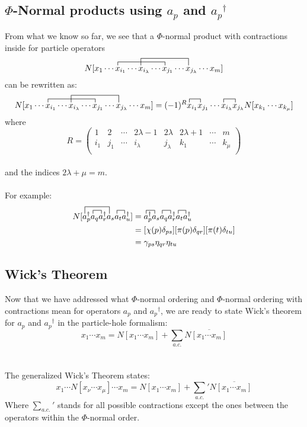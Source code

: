 \documentclass{article}
\newcommand{\ol}{\overline}
\newcommand{\fctr}{\contraction}
\newcommand{\dg}{\ensuremath{^\dagger} }
\newcommand{\cd}{\ensuremath{\cdots} }
\begin{document}
\subsection{$\Phi$-Normal products using $a_p$ and $a_p\dg$}
From what we know so far, we see that a $\Phi$-normal product with contractions inside for particle operators
\[ 
\fctr{N[x_1 \cd }{x}{{}_{i_1} \cd x_{i_\lambda} \cd }{x}
\fctr[2ex]{N[x_1 \cd x_{i_1} \cd}{ x}{{}_{i_\lambda} \cd x_{j_1} \cd }{x} 
N[x_1 \cd x_{i_1} \cd x_{i_\lambda} \cd x_{j_1} \cd x_{j_\lambda} \cd x_m] 
\] 
can be rewritten as: 
\[ 
\fctr{N[x_1 \cd }{x}{{}_{i_1} \cd x_{i_\lambda} \cd }{x}
\fctr[2ex]{N[x_1 \cd x_{i_1} \cd}{ x}{{}_{i_\lambda} \cd x_{j_1} \cd }{x} 
N[x_1 \cd x_{i_1} \cd x_{i_\lambda} \cd x_{j_1} \cd x_{j_\lambda} \cd x_m] 
= 
\fctr{(-1)^R}{x}{{}_{i_1} }{x}
\fctr{(-1)^R x_{i_1}x_{j_1} \cd}{x}{{}_{i_\lambda} }{x}
(-1)^R x_{i_1}x_{j_1} \cd x_{i_\lambda} x_{j_\lambda} N[x_{k_1} \cd x_{k_\mu}]
\] 
where 
\[
R = 
\begin{pmatrix}
1 & 2 & \cd & 2\lambda -1 & 2\lambda & 2\lambda + 1&\cd & m  \\
i_1 & j_1 & \cd& i_\lambda & j_\lambda  &k_1 & \cd & k_\mu \\
\end{pmatrix}
\] \\
and the indices $2\lambda + \mu = m$.
\\ \\
For example: 
\begin{align*}
N[ \fctr[2ex]{}{a}{{}_p\dg a_q a_r\dg}{a}
\fctr{ a_p\dg}{a}{{}_q }{a}
 a_p\dg a_q a_r\dg a_s \fctr{}{a}{{}_t}{a}a_t a_u\dg ] 
 &= \fctr{}{a}{{}_p\dg}{a} a_p\dg a_s \fctr{}{a}{{}_q}{a}a_q a_r\dg\fctr{}{a}{{}_t}{a}a_t a_u\dg \\
 &= [\chi(p)\delta_{ps}] [\pi(p)\delta_{qr}] [\pi(t) \delta_{tu}]  \\
 &= \gamma_{ps} \eta_{qr} \eta_{tu}
\end{align*}

\subsection{Wick's Theorem}
Now that we have addressed what $\Phi$-normal ordering and $\Phi$-normal ordering with contractions mean for operators $a_p$ and $a_p\dg$, we are ready to state Wick's theorem for 
$a_p$ and $a_p\dg$ in the particle-hole formalism: 
\[x_1 \cd x_m = N[x_1\cd x_m] + \sum_{a.c.} N\ol{[x_1 \cd x_m]} \]
\\ \\
The generalized Wick's Theorem states: 
\[x_1 \cd N[ x_\nu \cd x_\mu] \cd  x_m = N[x_1\cd x_m] + \sum_{a.c.}{}' N\ol{[x_1 \cd x_m]} \]
Where $ \sum_{a.c.}{}'$ stands for all possible contractions except the ones between the operators within the $\Phi$-normal order. 
\end{document}

